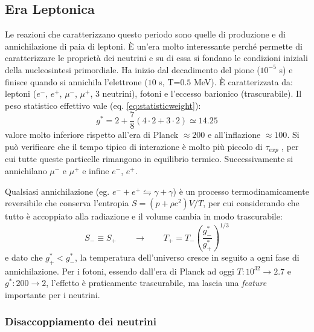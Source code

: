 \subsection{Era Leptonica}
Le reazioni che caratterizzano questo periodo sono quelle di produzione e di annichilazione di paia di leptoni. È un'era molto interessante perché permette di caratterizzare le proprietà dei neutrini e su di essa si fondano le condizioni iniziali della nucleosintesi primordiale. Ha inizio dal decadimento del pione ($10^{-5}$ s) e finisce quando si annichila l'elettrone ($10$ s, T=$0.5$ MeV). È caratterizzata da: leptoni ($e^-$, $e^+$, $\mu^-$, $\mu^+$, 3 neutrini), fotoni e l'eccesso barionico (trascurabile). Il peso statistico effettivo vale (eq. \ref{eq:statisticweight}):
$$
g^* = 2 + \frac{7}{8}(4\cdot 2 + 3 \cdot 2) \simeq 14.25
$$
valore molto inferiore rispetto all'era di Planck $\approx 200$ e all'inflazione $\approx 100$. Si può verificare che il tempo tipico di interazione è molto più piccolo di $\tau_{exp}$ , per cui tutte queste particelle rimangono in equilibrio termico. Successivamente si annichilano $\mu^-$ e $\mu^+$ e infine $e^-$, $e^+$.

Qualsiasi annichilazione (eg. $e^- + e^+ \leftrightharpoons \gamma + \gamma$) è un processo termodinamicamente reversibile che conserva l'entropia $S=(p+\rho c^2)V/T$, per cui considerando che tutto è accoppiato alla radiazione e il volume cambia in modo trascurabile:
\begin{equation}
    S_{-} \equiv S_{+} \qquad \rightarrow \qquad T_+ = T_- \left(\frac{g^*_-}{g^*_+}\right)^{1/3} 
\end{equation} 
e dato che $g^*_+ < g^*_-$, la temperatura dell'universo cresce in seguito a ogni fase di annichilazione. Per i fotoni, essendo dall'era di Planck ad oggi $T: 10^{32}\rightarrow 2.7$ e $g^*: 200\rightarrow 2$, l'effetto è praticamente trascurabile, ma lascia una \textit{feature} importante per i neutrini.

\subsubsection{Disaccoppiamento dei neutrini}

